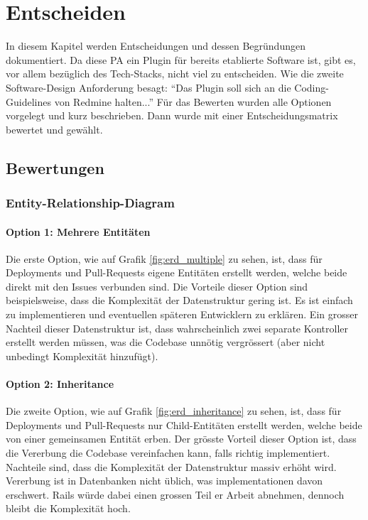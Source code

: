 \chapter{Entscheiden}
\label{chap:decide}
In diesem Kapitel werden Entscheidungen und dessen Begründungen dokumentiert. \newline
Da diese PA ein Plugin für bereits etablierte Software ist, gibt es, vor allem bezüglich des Tech-Stacks, nicht viel zu
entscheiden. Wie die zweite Software-Design Anforderung besagt: \enquote{Das Plugin soll sich an die Coding-Guidelines von
Redmine halten...} \newline
Für das Bewerten wurden alle Optionen vorgelegt und kurz beschrieben. Dann wurde mit einer Entscheidungsmatrix
bewertet und gewählt. \newline

\section{Bewertungen}
\subsection{Entity-Relationship-Diagram}
\subsubsection{Option 1: Mehrere Entitäten}
Die erste Option, wie auf Grafik \ref{fig:erd_multiple} zu sehen, ist, dass für Deployments und Pull-Requests
eigene Entitäten erstellt werden, welche beide direkt mit den Issues verbunden sind. \newline
Die Vorteile dieser Option sind beispielsweise, dass die Komplexität der Datenstruktur gering ist. Es ist einfach zu
implementieren und eventuellen späteren Entwicklern zu erklären. \newline
Ein grosser Nachteil dieser Datenstruktur ist, dass wahrscheinlich zwei separate Kontroller erstellt werden müssen, was
die Codebase unnötig vergrössert (aber nicht unbedingt Komplexität hinzufügt).

\subsubsection{Option 2: Inheritance}
Die zweite Option, wie auf Grafik \ref{fig:erd_inheritance} zu sehen, ist, dass für Deployments und Pull-Requests nur
Child-Entitäten erstellt werden, welche beide von einer gemeinsamen Entität erben. \newline
Der grösste Vorteil dieser Option ist, dass die Vererbung die Codebase vereinfachen kann, falls richtig implementiert.
\newline
Nachteile sind, dass die Komplexität der Datenstruktur massiv erhöht wird. Vererbung ist in Datenbanken nicht üblich, was
implementationen davon erschwert. Rails würde dabei einen grossen Teil er Arbeit abnehmen, dennoch bleibt die Komplexität
hoch.

